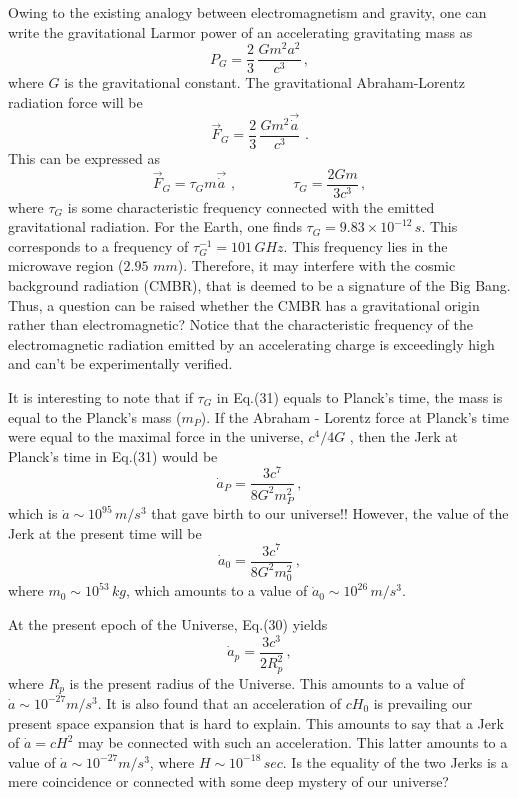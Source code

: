 \documentclass[12pt]{article}
\begin{document}
Owing to the existing analogy between electromagnetism and gravity, one can write the gravitational Larmor power of an accelerating gravitating mass as {\cite{gravitomagnetism}}
\begin{equation}
P_G=\frac{2}{3}\, \frac{Gm^2a^2}{c^3}\,,
\end{equation}
where $G$ is the gravitational constant. The gravitational Abraham-Lorentz radiation force will be
\begin{equation}
\vec{F}_G=\frac{2}{3}\, \frac{Gm^2\vec{\dot a}}{c^3}\,\,.
\end{equation}
This can be expressed as
\begin{equation}
\vec{F}_G=\tau_Gm\vec{\dot a}\,\,,\qquad\qquad \tau_G=\frac{2Gm}{3c^3}\,,
\end{equation}
where  $\tau_G$ is some characteristic frequency connected with the emitted gravitational radiation.
For the Earth, one finds $\tau_G=9.83\times 10^{-12}\, s$. This corresponds to a frequency of $\tau_G^{-1}=101\, GHz$. This frequency lies   in the microwave region ($2.95\,\, mm$). Therefore, it may interfere with the cosmic background radiation (CMBR), that is deemed to be a signature of the Big Bang. Thus, a question can be raised whether the CMBR has a gravitational origin rather than electromagnetic? Notice that the characteristic frequency of the electromagnetic radiation emitted by an accelerating charge is exceedingly high and can't be experimentally verified.

It is interesting to note that if $\tau_G$ in Eq.(31) equals to Planck's time, the mass is equal to the Planck's mass ($m_P$). If the Abraham - Lorentz force at Planck's time were equal to the maximal force in the universe, $c^4/4G$ {\cite{maximal,maximal1}}, then the Jerk at Planck's time in Eq.(31) would be
\begin{equation}
\dot a_P=\frac{3c^7}{8G^2m_P^2}\,,
\end{equation}
which is  $\dot a\sim 10^{95}\,m/s^3$ that gave birth to our universe!!  However, the value of the Jerk at the present time will be
\begin{equation}
\dot a_0=\frac{3c^7}{8G^2m_0^2}\,,
\end{equation}
where $m_0\sim 10^{53}\, kg$, which amounts to a value of $\dot a_0\sim 10^{26}\, m/s^3$.

At the present epoch of the Universe, Eq.(30) yields
\begin{equation}
\dot a_p=\frac{3c^3}{2R_p^2}\,,
\end{equation}
where $R_p$ is the present radius of the Universe. This amounts to a value of $\dot a\sim 10^{-27} m/s^3$. It is also found that an acceleration of $cH_0$ is prevailing our present space expansion that is hard to explain. This amounts to say that a Jerk of $\dot a=cH^2$ may be connected with such an acceleration. This latter amounts to a value of $\dot a\sim 10^{-27}m/s^3$, where $H\sim 10^{-18}\, sec$. Is the equality of the two Jerks is  a mere coincidence or connected with some deep mystery of  our universe?
\end{document}
